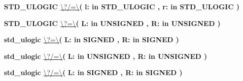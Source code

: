 \begin{DoxyCompactItemize}
\item 
{\bfseries {\bfseries \textcolor{comment}{S\+T\+D\+\_\+\+U\+L\+O\+G\+I\+C}\textcolor{vhdlchar}{ }}} \hyperlink{class__fixed__pkg_a6c6e2cca732277bb9db1679431f7a7ee}{\textbackslash{}?/=\textbackslash{}}{\bfseries  ( }{\bfseries \textcolor{vhdlchar}{l\+: }\textcolor{stringliteral}{in }{\bfseries \textcolor{comment}{S\+T\+D\+\_\+\+U\+L\+O\+G\+I\+C}\textcolor{vhdlchar}{ }}}{\bfseries  , \textcolor{vhdlchar}{r\+: }\textcolor{stringliteral}{in }{\bfseries \textcolor{comment}{S\+T\+D\+\_\+\+U\+L\+O\+G\+I\+C}\textcolor{vhdlchar}{ }}}{\bfseries  )} 
\item 
{\bfseries {\bfseries \textcolor{comment}{S\+T\+D\+\_\+\+U\+L\+O\+G\+I\+C}\textcolor{vhdlchar}{ }}} \hyperlink{class__fixed__pkg_a8cb13e21bf841bcb05f30767ad54c888}{\textbackslash{}?=\textbackslash{}}{\bfseries  ( }{\bfseries \textcolor{vhdlchar}{L\+: }\textcolor{stringliteral}{in }{\bfseries \textcolor{comment}{U\+N\+S\+I\+G\+N\+E\+D}\textcolor{vhdlchar}{ }}}{\bfseries  , \textcolor{vhdlchar}{R\+: }\textcolor{stringliteral}{in }{\bfseries \textcolor{comment}{U\+N\+S\+I\+G\+N\+E\+D}\textcolor{vhdlchar}{ }}}{\bfseries  )} 
\item 
{\bfseries {\bfseries \textcolor{comment}{std\+\_\+ulogic}\textcolor{vhdlchar}{ }}} \hyperlink{class__fixed__pkg_a8d3800c8f9db376e23af776a543583ab}{\textbackslash{}?=\textbackslash{}}{\bfseries  ( }{\bfseries \textcolor{vhdlchar}{L\+: }\textcolor{stringliteral}{in }{\bfseries \textcolor{comment}{S\+I\+G\+N\+E\+D}\textcolor{vhdlchar}{ }}}{\bfseries  , \textcolor{vhdlchar}{R\+: }\textcolor{stringliteral}{in }{\bfseries \textcolor{comment}{S\+I\+G\+N\+E\+D}\textcolor{vhdlchar}{ }}}{\bfseries  )} 
\item 
{\bfseries {\bfseries \textcolor{comment}{std\+\_\+ulogic}\textcolor{vhdlchar}{ }}} \hyperlink{class__fixed__pkg_ac0a18348d3857a1e8859ce08533dd95e}{\textbackslash{}?/=\textbackslash{}}{\bfseries  ( }{\bfseries \textcolor{vhdlchar}{L\+: }\textcolor{stringliteral}{in }{\bfseries \textcolor{comment}{U\+N\+S\+I\+G\+N\+E\+D}\textcolor{vhdlchar}{ }}}{\bfseries  , \textcolor{vhdlchar}{R\+: }\textcolor{stringliteral}{in }{\bfseries \textcolor{comment}{U\+N\+S\+I\+G\+N\+E\+D}\textcolor{vhdlchar}{ }}}{\bfseries  )} 
\item 
{\bfseries {\bfseries \textcolor{comment}{std\+\_\+ulogic}\textcolor{vhdlchar}{ }}} \hyperlink{class__fixed__pkg_ac0a18348d3857a1e8859ce08533dd95e}{\textbackslash{}?/=\textbackslash{}}{\bfseries  ( }{\bfseries \textcolor{vhdlchar}{L\+: }\textcolor{stringliteral}{in }{\bfseries \textcolor{comment}{S\+I\+G\+N\+E\+D}\textcolor{vhdlchar}{ }}}{\bfseries  , \textcolor{vhdlchar}{R\+: }\textcolor{stringliteral}{in }{\bfseries \textcolor{comment}{S\+I\+G\+N\+E\+D}\textcolor{vhdlchar}{ }}}{\bfseries  )} 

\end{DoxyCompactItemize}
